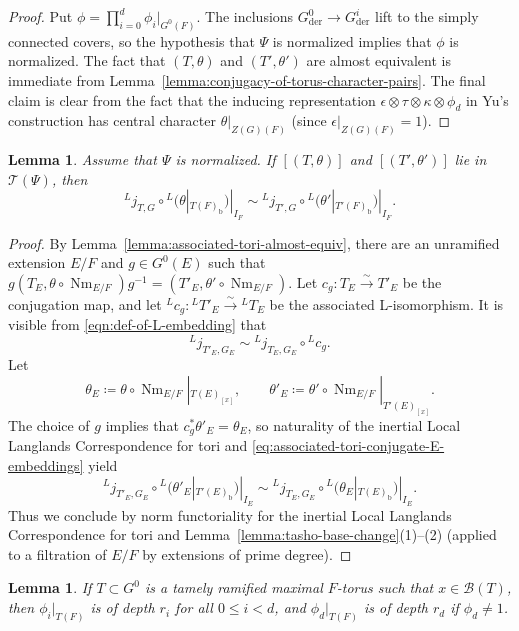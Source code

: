 \documentclass[reqno]{amsart}
\numberwithin{equation}{subsection}
\newcommand{\co}{\colon}
\newcommand{\ld}{{}^L}
\newcommand\cB{\mathcal{B}}
\newcommand\cT{\mathcal{T}}
\DeclareMathOperator{\Nm}{Nm}
\DeclareMathOperator{\der}{der}
\newtheorem{lemma}[thm]{Lemma}
\theoremstyle{remark}
\numberwithin{equation}{subsection}
\numberwithin{figure}{subsection}
\begin{document}
\begin{proof}
Put $\phi=\prod_{i=0}^d\phi_i|_{G^0(F)}$. The inclusions $G^0_{\der}\to G^i_{\der}$ lift to the simply connected covers, so the hypothesis that $\Psi$ is normalized implies that $\phi$ is normalized. The fact that $(T, \theta)$ and $(T', \theta')$ are almost equivalent is immediate from Lemma~\ref{lemma:conjugacy-of-torus-character-pairs}. The final claim is clear from the fact that the inducing representation $\epsilon\otimes\tau\otimes\kappa\otimes\phi_d$ in Yu's construction has central character $\theta|_{Z(G)(F)}$ (since $\epsilon|_{Z(G)(F)} = 1$).
\end{proof}

\begin{lemma}\label{lemma:associated-tori-inertial-parameter}
Assume that $\Psi$ is normalized. If $[(T,\theta)]$ and $[(T',\theta')]$ lie in $\cT(\Psi)$, then
\[
\ld j_{T,G}\circ\ld(\theta|_{T(F)_{\mathrm b}})|_{I_F}
\sim
\ld j_{T',G}\circ\ld(\theta'|_{T'(F)_{\mathrm b}})|_{I_F}.
\]
\end{lemma}

\begin{proof}
By Lemma~\ref{lemma:associated-tori-almost-equiv}, there are an unramified extension $E/F$ and $g\in G^0(E)$ such that $g(T_E, \theta \circ \Nm_{E/F})g^{-1} = (T'_E, \theta' \circ \Nm_{E/F})$. Let $c_g \co T_E\xrightarrow{\sim}T'_E$ be the conjugation map, and let $\ld c_g \co\ld T'_E\xrightarrow{\sim}\ld T_E$ be the associated L-isomorphism. It is visible from \eqref{eqn:def-of-L-embedding} that
\begin{equation}\label{eq:associated-tori-conjugate-E-embeddings}
    \ld j_{T'_E,G_E}
    \sim  \ld j_{T_E,G_E}\circ\ld c_g.
\end{equation}
Let
\[
    \theta_E\coloneqq\theta\circ \Nm_{E/F}|_{T(E)_{[x]}},
    \qquad
    \theta'_E\coloneqq\theta'\circ \Nm_{E/F}|_{T'(E)_{[x]}}.
\]
The choice of $g$ implies that $c_g^*\theta'_E=\theta_E$, so naturality of the inertial Local Langlands Correspondence for tori and \eqref{eq:associated-tori-conjugate-E-embeddings} yield
\[
    \ld j_{T'_E,G_E}\circ\ld(\theta'_E|_{T'(E)_{\mathrm b}})|_{I_E}
    \sim 
    \ld j_{T_E,G_E}\circ\ld(\theta_E|_{T(E)_{\mathrm b}})|_{I_E}.
\]
Thus we conclude by norm functoriality for the inertial Local Langlands Correspondence for tori and Lemma~\ref{lemma:tasho-base-change}(1)--(2) (applied to a filtration of $E/F$ by extensions of prime degree).
\end{proof}

\begin{lemma}\label{lemma:character-restricted-to-torus-depth}
If $T\subset G^0$ is a tamely ramified maximal $F$-torus such that $x\in\cB(T)$, then $\phi_i|_{T(F)}$ is of depth $r_i$ for all $0\leq i<d$, and $\phi_d|_{T(F)}$ is of depth $r_d$ if $\phi_d\neq1$.
\end{lemma}
\end{document}
